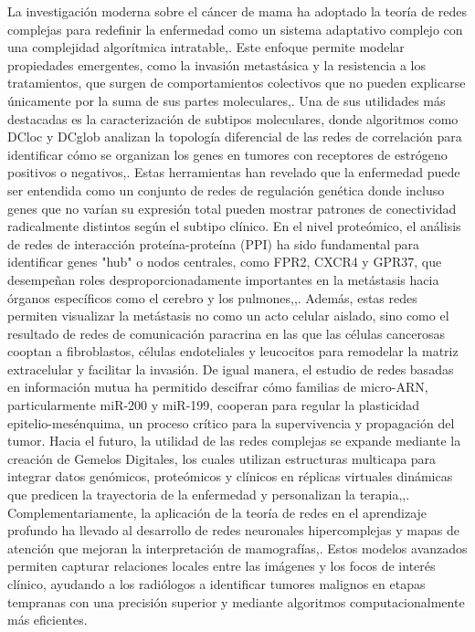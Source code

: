 \documentclass[12pt,spanish]{article}
\begin{document}
	La investigación moderna sobre el cáncer de mama ha adoptado la teoría de redes complejas para redefinir la enfermedad como un sistema adaptativo complejo con una complejidad algorítmica intratable,. Este enfoque permite modelar propiedades emergentes, como la invasión metastásica y la resistencia a los tratamientos, que surgen de comportamientos colectivos que no pueden explicarse únicamente por la suma de sus partes moleculares,. Una de sus utilidades más destacadas es la caracterización de subtipos moleculares, donde algoritmos como DCloc y DCglob analizan la topología diferencial de las redes de correlación para identificar cómo se organizan los genes en tumores con receptores de estrógeno positivos o negativos,. Estas herramientas han revelado que la enfermedad puede ser entendida como un conjunto de redes de regulación genética donde incluso genes que no varían su expresión total pueden mostrar patrones de conectividad radicalmente distintos según el subtipo clínico.
	En el nivel proteómico, el análisis de redes de interacción proteína-proteína (PPI) ha sido fundamental para identificar genes "hub" o nodos centrales, como FPR2, CXCR4 y GPR37, que desempeñan roles desproporcionadamente importantes en la metástasis hacia órganos específicos como el cerebro y los pulmones,,. Además, estas redes permiten visualizar la metástasis no como un acto celular aislado, sino como el resultado de redes de comunicación paracrina en las que las células cancerosas cooptan a fibroblastos, células endoteliales y leucocitos para remodelar la matriz extracelular y facilitar la invasión. De igual manera, el estudio de redes basadas en información mutua ha permitido descifrar cómo familias de micro-ARN, particularmente miR-200 y miR-199, cooperan para regular la plasticidad epitelio-mesénquima, un proceso crítico para la supervivencia y propagación del tumor.
	Hacia el futuro, la utilidad de las redes complejas se expande mediante la creación de Gemelos Digitales, los cuales utilizan estructuras multicapa para integrar datos genómicos, proteómicos y clínicos en réplicas virtuales dinámicas que predicen la trayectoria de la enfermedad y personalizan la terapia,,. Complementariamente, la aplicación de la teoría de redes en el aprendizaje profundo ha llevado al desarrollo de redes neuronales hipercomplejas y mapas de atención que mejoran la interpretación de mamografías,. Estos modelos avanzados permiten capturar relaciones locales entre las imágenes y los focos de interés clínico, ayudando a los radiólogos a identificar tumores malignos en etapas tempranas con una precisión superior y mediante algoritmos computacionalmente más eficientes.
	
\end{document}
